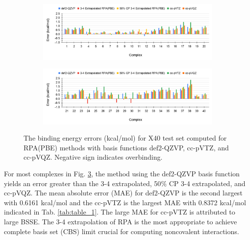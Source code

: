 \documentclass[11pt]{article}
\begin{document}
\begin{figure}[hbpt]
  \centering
  \begin{subfigure}{\textwidth}
    \center
    \includegraphics[scale=0.35]{def2-QZVP_1.png}
    \label{fig:def2-QZVP_1}
  \end{subfigure}
  \begin{subfigure}{\textwidth}
    \center
    \includegraphics[scale=0.35]{def2-QZVP_2.png}
    \label{fig:def2-QZVP_2}
  \end{subfigure}
  \caption{The binding energy errors (kcal/mol) for X40 test set computed
    for RPA(PBE) methods with basis functions def2-QZVP, cc-pVTZ, and
    cc-pVQZ. Negative sign indicates overbinding.}
  \label{fig:def2-QZVP Error}
\end{figure}

For most complexes in Fig. \ref{fig:def2-QZVP Error}, the method using
the def2-QZVP basis function yields an error greater than the 3-4 extrapolated,
50$\%$ CP 3-4 extrapolated, and cc-pVQZ. The mean absolute error (MAE) for
def2-QZVP is the second largest with 0.6161 kcal/mol and the cc-pVTZ is the
largest MAE with 0.8372 kcal/mol indicated in Tab. \ref{tab:table_1}. The
large MAE for cc-pVTZ is attributed to large BSSE. The 3-4 extrapolation
of RPA is the most appropriate to achieve complete basis set (CBS) limit
crucial for computing noncovalent interactions.
\end{document}
